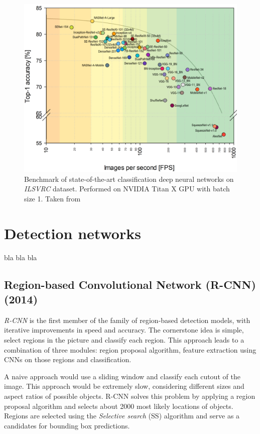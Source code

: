 \begin{figure}
    \includegraphics[width=\textwidth]{img/fps_comp}
    \caption{Benchmark of state-of-the-art classification deep neural networks on \textit{ILSVRC} dataset. Performed on NVIDIA
Titan X GPU with batch size 1. Taken from \cite[fig. 3]{bib:cnnbenchmark}}
    \label{fig:cnnbenchmark}
\end{figure}



\section{Detection networks}
\label{sec:detnets}
bla bla bla

\subsection{Region-based Convolutional Network (R-CNN) (2014)}
\textit{R-CNN} \cite{bib:rcnn} is the first member of the family of region-based detection models, with iterative improvements in speed and accuracy. The cornerstone idea is simple, select regions in the picture and classify each region. This approach leads to a combination of three modules: region proposal algorithm, feature extraction using CNNs on those regions and classification. 

A naive approach would use a sliding window and classify each cutout of the image.  This approach would be extremely slow, considering different sizes and aspect ratios of possible objects. R-CNN solves this problem by applying a region proposal algorithm and selects about 2000 most likely locations of objects. Regions are selected using the \textit{Selective search} (SS) \cite{bib:selectivesearch} algorithm and serve as a candidates for bounding box predictions.

